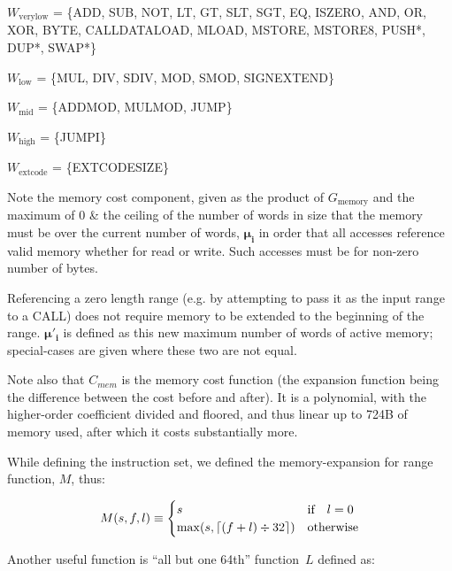 \documentclass[9pt,oneside]{amsart}
\DeclarePairedDelimiter{\ceil}{\lceil}{\rceil}
\begin{document}
$W_{\mathrm{verylow}}$ = \{{\small ADD}, {\small SUB}, {\small NOT}, {\small LT}, {\small GT}, {\small SLT}, {\small SGT}, {\small EQ}, {\small ISZERO}, {\small AND}, {\small OR}, {\small XOR}, {\small BYTE}, {\small CALLDATALOAD}, \newline \noindent\hspace*{1cm} {\small MLOAD}, {\small MSTORE}, {\small MSTORE8}, {\small PUSH*}, {\small DUP*}, {\small SWAP*}\}

$W_{\mathrm{low}}$ = \{{\small MUL}, {\small DIV}, {\small SDIV}, {\small MOD}, {\small SMOD}, {\small SIGNEXTEND}\}

$W_{\mathrm{mid}}$ = \{{\small ADDMOD}, {\small MULMOD}, {\small JUMP}\}

$W_{\mathrm{\mathrm{high}}}$ = \{{\small JUMPI}\}

$W_{\mathrm{extcode}}$ = \{{\small EXTCODESIZE}\}

Note the memory cost component, given as the product of $G_{\mathrm{memory}}$ and the maximum of 0 \& the ceiling of the number of words in size that the memory must be over the current number of words, $\boldsymbol{\mu}_\mathbf{i}$ in order that all accesses reference valid memory whether for read or write. Such accesses must be for non-zero number of bytes.

Referencing a zero length range (e.g. by attempting to pass it as the input range to a CALL) does not require memory to be extended to the beginning of the range. $\boldsymbol{\mu}'_\mathbf{i}$ is defined as this new maximum number of words of active memory; special-cases are given where these two are not equal.

Note also that $C_{mem}$ is the memory cost function (the expansion function being the difference between the cost before and after). It is a polynomial, with the higher-order coefficient divided and floored, and thus linear up to 724B of memory used, after which it costs substantially more.

While defining the instruction set, we defined the memory-expansion for range function, $M$, thus:

\begin{equation}
M(s, f, l) \equiv \begin{cases}
s & \text{if} \quad l = 0 \\
\max(s, \ceil{ (f + l) \div 32 }) & \text{otherwise}
\end{cases}
\end{equation}

Another useful function is ``all but one 64th'' function~$L$ defined as:
\end{document}
